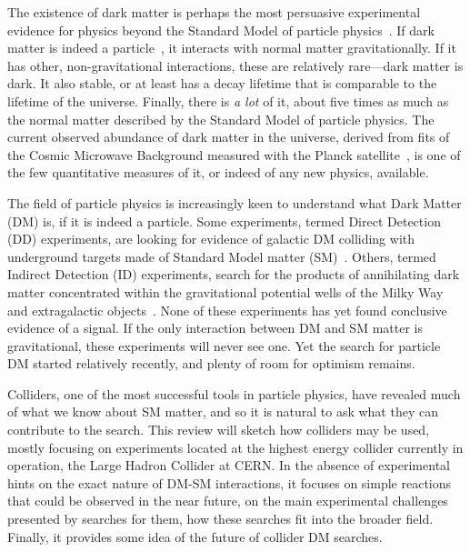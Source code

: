 


The existence of dark matter is perhaps the most persuasive experimental evidence for physics beyond the Standard Model of particle physics~\cite{Bertone:2016nfn}. 
If dark matter is indeed a particle~\cite{Steigman:1979kw}, it interacts with normal matter gravitationally. If it has other, non-gravitational interactions, these are relatively rare---dark matter is dark. It also stable, or at least has a decay lifetime that is comparable to the lifetime of the universe. Finally, there is {\it a lot} of it, about five times as much as the normal matter described by the Standard Model of particle physics. The current observed abundance of dark matter in the universe, derived from fits of the Cosmic Microwave Background measured with the Planck satellite~\cite{Ade:2015xua}, is one of the few quantitative measures of it, or indeed of any new physics, available.

The field of particle physics is increasingly keen to understand what Dark Matter (DM) is, if it is indeed a particle. 
Some experiments, termed Direct Detection (DD) experiments, are looking for evidence of galactic DM colliding with underground targets made of Standard Model matter (SM)~\cite{0954-3899-43-1-013001}. Others, termed Indirect Detection (ID) experiments, search for the products of annihilating dark matter concentrated within the gravitational potential wells of the Milky Way and extragalactic objects~\cite{Gaskins:2016cha}. None of these experiments has yet found conclusive evidence of a signal. If the only interaction between DM and SM matter is gravitational, these experiments will never see one. Yet the search for particle DM started relatively recently, and plenty of room for optimism remains.

Colliders, one of the most successful tools in particle physics, have revealed much of what we know about SM matter, and so it is natural to ask what they can contribute to the search.
This review will sketch how colliders may be used, mostly focusing on experiments located at the highest energy collider currently in operation, the Large Hadron Collider at CERN. In the absence of experimental hints on the exact nature of DM-SM interactions, it focuses on simple reactions that could be observed in the near future, on the main experimental challenges presented by searches for them, how these searches fit into the broader field. Finally, it provides some idea of the future of collider DM searches.

